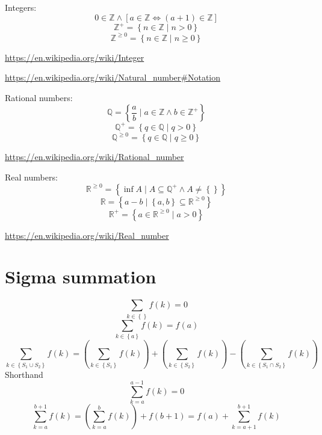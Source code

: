 \documentclass[]{article}
\newcommand{\pqty}[1]{{\left(#1\right)}}
\newcommand{\Bqty}[1]{{\left\{#1\right\}}}
\newcommand{\bqty}[1]{{\left[#1\right]}}
\numberwithin{equation}{section}
\begin{document}
	Integers:
	\begin{equation}
	0\in\mathbb{Z}\land\bqty{a\in\mathbb{Z}\Leftrightarrow \pqty{a+1}\in\mathbb{Z}}
	\end{equation}
	\begin{equation}
	\mathbb{Z}^+=\Bqty{n\in\mathbb{Z}\mid n>0}
	\end{equation}
	\begin{equation}
	\mathbb{Z}^{\geq 0}=\Bqty{n\in\mathbb{Z}\mid n\geq 0}
	\end{equation}
	
	\url{https://en.wikipedia.org/wiki/Integer}
	
	\url{https://en.wikipedia.org/wiki/Natural_number#Notation}
	
	Rational numbers:
	\begin{equation}
	\mathbb{Q}=\Bqty{\frac{a}{b}\mid a\in\mathbb{Z}\land b\in\mathbb{Z}^+}
	\end{equation}
	\begin{equation}
	\mathbb{Q}^+=\Bqty{q\in\mathbb{Q}\mid q>0}
	\end{equation}
	\begin{equation}
	\mathbb{Q}^{\geq 0}=\Bqty{q\in\mathbb{Q}\mid q\geq 0}
	\end{equation}
	
	\url{https://en.wikipedia.org/wiki/Rational_number}
	
	Real numbers:
	\begin{equation}
	\mathbb{R}^{\geq 0}=\Bqty{\inf A\mid A\subseteq\mathbb{Q}^+\land A\neq \Bqty{}}
	\end{equation}
	\begin{equation}
	\mathbb{R}=\Bqty{a-b\mid \Bqty{a,b}\subseteq\mathbb{R}^{\geq 0}}
	\end{equation}
	\begin{equation}
	\mathbb{R}^+=\Bqty{a\in\mathbb{R}^{\geq 0}\mid a>0}
	\end{equation}
	
	\url{https://en.wikipedia.org/wiki/Real_number}
	
	\section{Sigma summation}
	\begin{equation}
	\sum_{k\in\Bqty{}}f\pqty{k}=0
	\end{equation}
	\begin{equation}
	\sum_{k\in\Bqty{a}}f\pqty{k}=f\pqty{a}
	\end{equation}
	\begin{equation}
	\sum_{k\in\Bqty{S_1\cup S_2}}f\pqty{k}
	=
	\pqty{\sum_{k\in\Bqty{S_1}}f\pqty{k}}
	+
	\pqty{\sum_{k\in\Bqty{S_2}}f\pqty{k}}
	-
	\pqty{\sum_{k\in\Bqty{S_1\cap S_2}}f\pqty{k}}
	\end{equation}
	Shorthand
	\begin{equation}
	\sum_{k={a}}^{a-1} f\pqty{k}=0
	\end{equation}
	\begin{equation}
	\sum_{k={a}}^{b+1} f\pqty{k}=
	\pqty{\sum_{k={a}}^{b} f\pqty{k}}+f\pqty{b+1}=
	f\pqty{a}+{\sum_{k={a+1}}^{b+1} f\pqty{k}}
	\end{equation}
	
\end{document}
